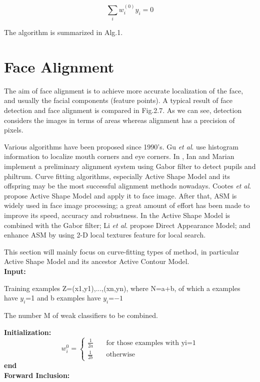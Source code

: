 \documentclass[12pt, twoside]{report}
\begin{document}
	\begin{equation}
		\sum_{i}w_i^{(0)} y_i = 0
	\end{equation}

	\par
	The algorithm is summarized in Alg.1.
	
	\section{Face Alignment}
	The aim of face alignment is to achieve more accurate localization of the face, and usually the facial components (feature points). A typical result of face detection and face alignment is compared in Fig.2.7. As we can see, detection considers the images in terms of areas whereas alignment has a precision of pixels.
	\par
	Various algorithms have been proposed since 1990's. Gu \textit{ et al}. \cite{29} use histogram information to localize mouth corners and eye corners. In \cite{26}, Ian and Marian implement a preliminary alignment system using Gabor filter to detect pupils and philtrum. Curve fitting algorithms, especially Active Shape Model \cite{18} and its offspring may be the most successful alignment methods nowadays. Cootes \textit{ et al}. \cite{18} \cite{45} \cite{16} propose Active Shape Model and apply it to face image. After that, ASM is widely used in face image processing; a great amount of effort has been made to improve its speed, accuracy and robustness. In \cite{36} the Active Shape Model is combined with the Gabor filter;
	Li \textit{ et al}. \cite{78} propose Direct Appearance Model; \cite{56} and \cite{101} enhance ASM by using 2-D local textures feature for local search. 

	\par
	This section will mainly focus on curve-fitting types of method, in particular Active Shape Model and its ancestor Active Contour Model. \\ 
	\textbf{Input:} \\
	\par Training examples Z={(x1,y1),...,(xn,yn)}, where N=a+b, of which a examples have $y_i$=1 and b examples have $y_i$=$-1$ \\
	\par The number M of weak classifiers to be combined.

	\textbf{Initialization:} \\
	\[
		w_i^{0}= \begin{cases}
			\frac{1}{2a}  & \quad \text{for those examples with yi=1} \\
			\frac{1}{2b}  & \quad \text{otherwise}
			\end{cases}
	\]
	\textbf{end}\\
	\textbf{Forward Inclusion:} \\
\end{document}
